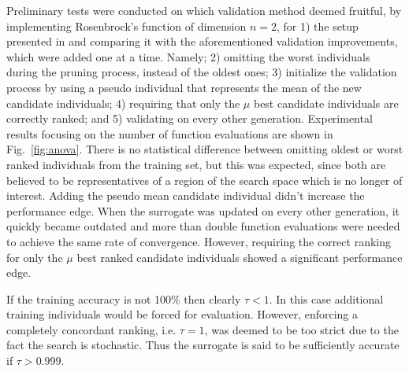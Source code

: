 \documentclass[10pt, conference]{IEEEtran} %
\begin{document}
Preliminary tests were conducted on which validation method deemed fruitful, by implementing  Rosenbrock's function of dimension $n=2$, for 1) the setup presented in \cite{Ru06:PPSN} and comparing it with the aforementioned validation improvements, which were added one at a time. Namely; 2) omitting the worst individuals  during the pruning process, instead of the oldest ones; 3) initialize the validation process by using a pseudo individual  that represents the mean of the new candidate individuals; 4) requiring that only the $\mu$ best candidate individuals are correctly ranked; and 5) validating on every other generation. 
Experimental results focusing on the number of function evaluations are shown in Fig.~\ref{fig:anova}. There is no statistical difference between omitting oldest or worst ranked individuals  from the training set, but this was expected, since both are believed to be representatives of a region of the search space which is no longer of interest. Adding the pseudo mean candidate individual didn't increase the performance edge. When the surrogate was updated on every other generation, it quickly became outdated and more than double function evaluations were needed to achieve the same rate of convergence. 
However, requiring the correct ranking for only the $\mu$ best ranked candidate individuals showed a significant performance edge. 

If the training accuracy is not 100\% then clearly $\tau < 1$. In this case additional training individuals  would be forced for evaluation. However, enforcing a completely concordant ranking, i.e. $\tau=1$, was deemed to be too strict due to the fact the search is stochastic. Thus the surrogate is said to be sufficiently accurate if $\tau>0.999$. 
\end{document}
